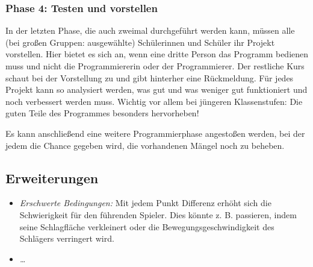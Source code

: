 \subsubsection{Phase 4: Testen und
vorstellen}\label{phase-4-testen-und-vorstellen}

In der letzten Phase, die auch zweimal durchgeführt werden kann, müssen
alle (bei großen Gruppen: ausgewählte) Schülerinnen und Schüler ihr
Projekt vorstellen. Hier bietet es sich an, wenn eine dritte Person das
Programm bedienen muss und nicht die Programmiererin oder der
Programmierer. Der restliche Kurs schaut bei der Vorstellung zu und gibt
hinterher eine Rückmeldung. Für jedes Projekt kann so analysiert werden,
was gut und was weniger gut funktioniert und noch verbessert werden
muss. Wichtig vor allem bei jüngeren Klassenstufen: Die guten Teile des
Programmes besonders hervorheben!

Es kann anschließend eine weitere Programmierphase angestoßen werden,
bei der jedem die Chance gegeben wird, die vorhandenen Mängel noch zu
beheben.

\subsection{Erweiterungen}\label{erweiterungen}

\begin{itemize}
\item
  \emph{Erschwerte Bedingungen:} Mit jedem Punkt Differenz erhöht sich
  die Schwierigkeit für den führenden Spieler. Dies könnte z. B.
  passieren, indem seine Schlagfläche verkleinert oder die
  Bewegungsgeschwindigkeit des Schlägers verringert wird.
\item
  \emph{\ldots{}}
\end{itemize}
